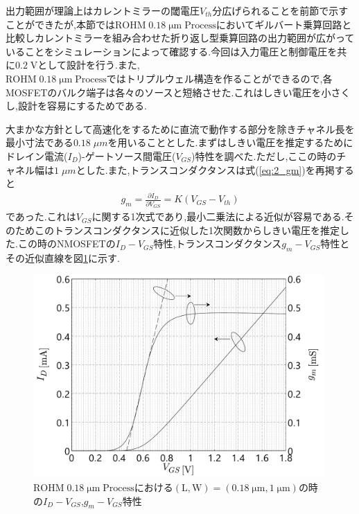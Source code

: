         出力範囲が理論上はカレントミラーの閾電圧$V_{th}$分広げられることを前節で示すことができたが,本節では$\mathrm{ROHM\;0.18\;\mu m\;Process}$においてギルバート乗算回路と比較しカレントミラーを組み合わせた折り返し型乗算回路の出力範囲が広がっていることをシミュレーションによって確認する.今回は入力電圧と制御電圧を共に$0.2\;\mathrm{V}$として設計を行う.また,\\$\mathrm{ROHM\;0.18\;\mu m\;Process}$ではトリプルウェル構造を作ることができるので,各MOSFETのバルク端子は各々のソースと短絡させた.これはしきい電圧を小さくし,設計を容易にするためである.\par
        大まかな方針として高速化をするために直流で動作する部分を除きチャネル長を最小寸法である$0.18\;\mu m$を用いることとした.まずはしきい電圧を推定するためにドレイン電流($I_{D}$)-ゲートソース間電圧($V_{GS}$)特性を調べた.ただし,ここの時のチャネル幅は$1\;\mu m$とした.また,トランスコンダクタンスは式(\ref{eq:2_gm})を再掲すると
        \begin{align*}
            g_{m}=\frac{\partial I_{D}}{\partial V_{GS}}=K(V_{GS}-V_{th})
        \end{align*}
        であった.これは$V_{GS}$に関する1次式であり,最小二乗法による近似が容易である.そのためこのトランスコンダクタンスに近似した1次関数からしきい電圧を推定した.この時のNMOSFETの$I_{D}-V_{GS}$特性,トランスコンダクタンス$g_{m}-V_{GS}$特性とその近似直線を図\ref{fig:3_vth_est}に示す.
        \begin{figure}[!b]
            \centering
            \includegraphics[width=0.99\textwidth]{figures/chapter3/id_vgs.pdf}
            \caption{$\mathrm{ROHM\;0.18\;\mu m\;Process}$における$\mathrm{(L,W)}=(0.18\;\mathrm{\mu m},1\;\mathrm{\mu m})$の時の$I_{D}-V_{GS}$,$g_{m}-V_{GS}$特性}
            \label{fig:3_vth_est}
        \end{figure}
